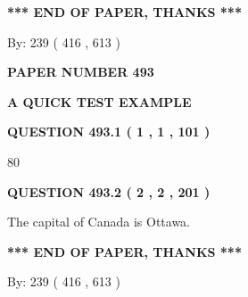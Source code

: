 \documentclass[12pt]{article}
\begin{document}
\vspace{1.0in} 
{\textbf{\large{ *** END OF PAPER, THANKS *** }}} 
   
   
\hspace{1.0in} By: 
 239 ( 416 ,  613 )
   
   
   
   
\newpage 
\setcounter{page}{ 
   493001 } 
   
   
   
   
 {\textbf{ \Large{ PAPER NUMBER  493  }}}
   
   
\vspace{0.2in}
   
   
   
   
   
   
 \vspace{0.2in}
{\LARGE {\textbf{ A QUICK TEST EXAMPLE}}}
   
   
  
\vspace{0.2in}
  
{\textbf{\Large{QUESTION
493.1 
 ( 1 , 1 , 101 )
}}}
  
  
 
 
\noindent{}

80
 
 
  
\vspace{0.2in}
  
{\textbf{\Large{QUESTION
493.2 
 ( 2 , 2 , 201 )
}}}
  
  
 
 
\noindent{}
 
 
The capital of Canada is Ottawa.
 
 
 
 
   
   
 \vspace{0.2in}
 
   
   
   
   
\vspace{1.0in} 
{\textbf{\large{ *** END OF PAPER, THANKS *** }}} 
   
   
\hspace{1.0in} By: 
 239 ( 416 ,  613 )
   
\end{document}
